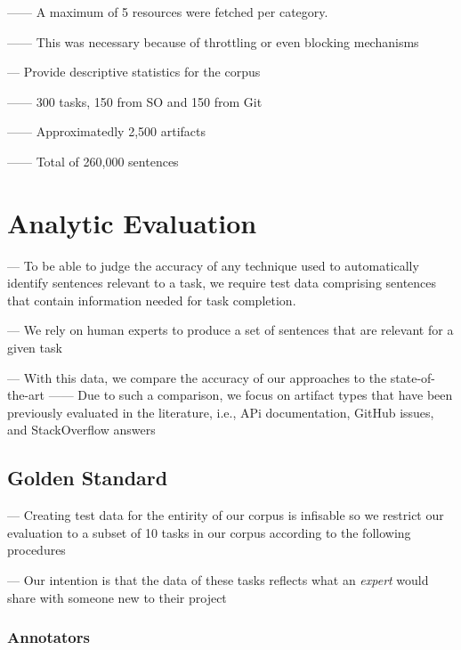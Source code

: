 ------ A maximum of 5 resources were fetched per category.

------ This was necessary because of throttling or even blocking mechanisms \vspace{3mm}

--- Provide descriptive statistics for the corpus

------ 300 tasks, 150 from SO and 150 from Git

------ Approximatedly 2,500 artifacts

------ Total of 260,000 sentences


\section{Analytic Evaluation}

--- To be able to judge the accuracy of any technique used to automatically identify sentences relevant to a task,
we require test data comprising sentences that contain information needed for task completion. \vspace{3mm}


--- We rely on human experts to produce a set of sentences that are relevant for a given task \vspace{3mm}


--- With this data, we compare the accuracy of our approaches to the state-of-the-art
------ Due to such a comparison, we focus on artifact types that have been previously evaluated in the literature, i.e., APi documentation, GitHub issues, and StackOverflow answers



\subsection{Golden Standard}

--- Creating test data for the entirity of our corpus is infisable so we restrict our evaluation to a subset of 10 tasks in our corpus according to the following procedures \vspace{3mm}

--- Our intention is that the data of these tasks reflects what an \textit{expert} would share with someone new to their project \vspace{3mm}


\subsubsection{Annotators}

